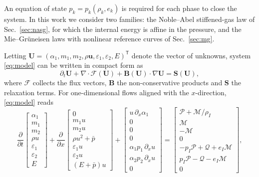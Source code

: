 \documentclass[a4paper,fleqn]{cas-sc}
\begin{document}
An equation of state $p_k=p_k(\rho_k,e_k)$ is required for each phase to close the system. In this work we consider two
families: the Noble--Abel stiffened-gas law of Sec.~\ref{sec:nasg}, for which the internal energy is affine in the
pressure, and the Mie--Gr\"uneisen laws with nonlinear reference curves of Sec.~\ref{sec:mg}.

Letting $\mathbf U=(\alpha_1,m_1,m_2,\rho\mathbf u,\varepsilon_1,\varepsilon_2,E)^{\mathsf T}$ denote the vector of unknowns, system \eqref{eq:model} can be
written in compact form as
\begin{equation}
\partial_t\mathbf U+\nabla\cdot\boldsymbol{\mathcal F}(\mathbf U)+\mathbf B(\mathbf U)\cdot\nabla\mathbf U=\mathbf S(\mathbf U),
\label{eq:compact}
\end{equation}
where $\boldsymbol{\mathcal F}$ collects the flux vectors, $\mathbf B$ the non-conservative products and $\mathbf S$ the relaxation terms. For
one-dimensional flows aligned with the $x$-direction, \eqref{eq:model} reads
\begin{equation}
\frac{\partial}{\partial t}\begin{bmatrix}\alpha_1\\ m_1\\ m_2\\ \rho u\\ \varepsilon_1\\ \varepsilon_2\\ E\end{bmatrix}
+\frac{\partial}{\partial x}\begin{bmatrix}0\\ m_1u\\ m_2u\\ \rho u^2+\bar p\\ \varepsilon_1u\\ \varepsilon_2u\\ (E+\bar p)u\end{bmatrix}
+\begin{bmatrix}u\,\partial_x\alpha_1\\0\\0\\0\\ \alpha_1p_1\,\partial_xu\\ \alpha_2p_2\,\partial_xu\\0\end{bmatrix}
=\begin{bmatrix}\mathcal P+\mathcal M/\rho_I\\ \mathcal M\\ -\mathcal M\\ 0\\ -p_I\mathcal P+\mathcal Q+e_I\mathcal M\\ p_I\mathcal P-\mathcal Q-e_I\mathcal M\\ 0\end{bmatrix},
\label{eq:general}
\end{equation}
\end{document}
